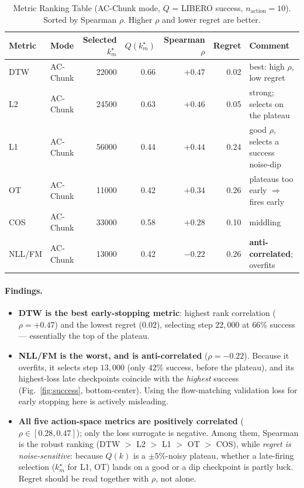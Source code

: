 \documentclass[11pt]{article}
\begin{document}
\begin{table}[h]
  \centering
  \caption{Metric Ranking Table (AC-Chunk mode, $Q$ = LIBERO success, $n_{\text{action}}{=}10$).
  Sorted by Spearman $\rho$. Higher $\rho$ and lower regret are better.}
  \begin{tabular}{llrrrrl}
    \toprule
    Metric & Mode & Selected $k_m^\star$ & $Q(k_m^\star)$ & Spearman $\rho$ & Regret & Comment \\
    \midrule
    DTW    & AC-Chunk & 22000 & 0.66 & $+0.47$ & 0.02 & best: high $\rho$, low regret \\
    L2     & AC-Chunk & 24500 & 0.63 & $+0.46$ & 0.05 & strong; selects on the plateau \\
    L1     & AC-Chunk & 56000 & 0.44 & $+0.44$ & 0.24 & good $\rho$, selects a success noise-dip \\
    OT     & AC-Chunk & 11000 & 0.42 & $+0.34$ & 0.26 & plateaus too early $\Rightarrow$ fires early \\
    COS    & AC-Chunk & 33000 & 0.58 & $+0.28$ & 0.10 & middling \\
    NLL/FM & AC-Chunk & 13000 & 0.42 & $-0.22$ & 0.26 & \textbf{anti-correlated}; overfits \\
    \bottomrule
  \end{tabular}
\end{table}

\paragraph{Findings.}
\begin{itemize}
  \item \textbf{DTW is the best early-stopping metric}: highest rank correlation ($\rho{=}+0.47$) and
        the lowest regret ($0.02$), selecting step $22{,}000$ at $66\%$ success --- essentially the
        top of the plateau.
  \item \textbf{NLL/FM is the worst, and is anti-correlated} ($\rho{=}-0.22$). Because it overfits, it
        selects step $13{,}000$ (only $42\%$ success, before the plateau), and its highest-loss late
        checkpoints coincide with the \emph{highest} success (Fig.~\ref{fig:success}, bottom-center).
        Using the flow-matching validation loss for early stopping here is actively misleading.
  \item \textbf{All five action-space metrics are positively correlated} ($\rho \in [0.28, 0.47]$);
        only the loss surrogate is negative. Among them, Spearman is the robust ranking
        (DTW $>$ L2 $>$ L1 $>$ OT $>$ COS), while \emph{regret is noise-sensitive}: because $Q(k)$ is
        a $\pm5\%$-noisy plateau, whether a late-firing selection ($k_m^\star$ for L1, OT) lands on a
        good or a dip checkpoint is partly luck. Regret should be read together with $\rho$, not alone.
\end{itemize}
\end{document}
